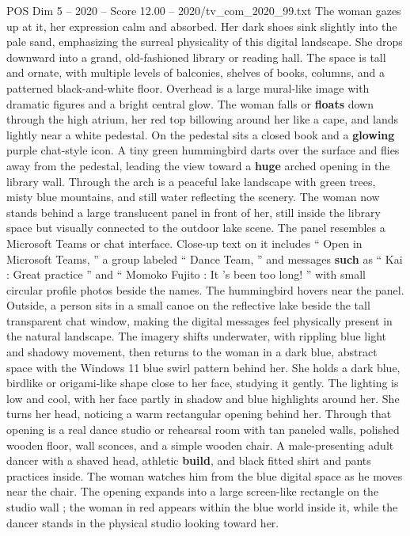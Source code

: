 \begin{textsample}{POS Dim 5 – 2020 – Score 12.00 – 2020/tv\_com\_2020\_99.txt}
The woman gazes up at it, her expression calm and absorbed.
Her dark shoes sink slightly into the pale sand, emphasizing the surreal physicality of this digital landscape.
She drops downward into a grand, old-fashioned library or reading hall.
The space is tall and ornate, with multiple levels of balconies, shelves of books, columns, and a patterned black-and-white floor.
Overhead is a large mural-like image with dramatic figures and a bright central glow.
The woman falls or \textbf{floats} down through the high atrium, her red top billowing around her like a cape, and lands lightly near a white pedestal.
On the pedestal sits a closed book and a \textbf{glowing} purple chat-style icon.
A tiny green hummingbird darts over the surface and flies away from the pedestal, leading the view toward a \textbf{huge} arched opening in the library wall.
Through the arch is a peaceful lake landscape with green trees, misty blue mountains, and still water reflecting the scenery.
The woman now stands behind a large translucent panel in front of her, still inside the library space but visually connected to the outdoor lake scene.
The panel resembles a Microsoft Teams or chat interface.
Close-up text on it includes “ Open in Microsoft Teams, ” a group labeled “ Dance Team, ” and messages \textbf{such} as “ Kai : Great practice ” and “ Momoko Fujito : It ’s been too long! ” with small circular profile photos beside the names.
The hummingbird hovers near the panel.
Outside, a person sits in a small canoe on the reflective lake beside the tall transparent chat window, making the digital messages feel physically present in the natural landscape.
The imagery shifts underwater, with rippling blue light and shadowy movement, then returns to the woman in a dark blue, abstract space with the Windows 11 blue swirl pattern behind her.
She holds a dark blue, birdlike or origami-like shape close to her face, studying it gently.
The lighting is low and cool, with her face partly in shadow and blue highlights around her.
She turns her head, noticing a warm rectangular opening behind her.
Through that opening is a real dance studio or rehearsal room with tan paneled walls, polished wooden floor, wall sconces, and a simple wooden chair.
A male-presenting adult dancer with a shaved head, athletic \textbf{build}, and black fitted shirt and pants practices inside.
The woman watches him from the blue digital space as he moves near the chair.
The opening expands into a large screen-like rectangle on the studio wall ; the woman in red appears within the blue world inside it, while the dancer stands in the physical studio looking toward her.

\end{textsample}
